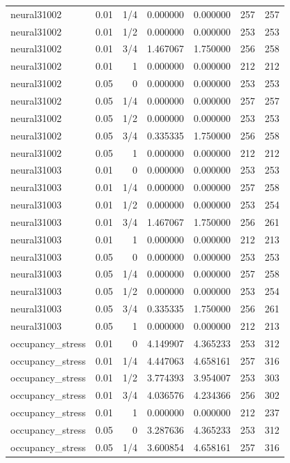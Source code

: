 {\begin{longtable}{lrrrrrr}
neural31002 & 0.01 & 1/4 & 0.000000 & 0.000000 & 257 & 257 \\
neural31002 & 0.01 & 1/2 & 0.000000 & 0.000000 & 253 & 253 \\
neural31002 & 0.01 & 3/4 & 1.467067 & 1.750000 & 256 & 258 \\
neural31002 & 0.01 & 1 & 0.000000 & 0.000000 & 212 & 212 \\
neural31002 & 0.05 & 0 & 0.000000 & 0.000000 & 253 & 253 \\
neural31002 & 0.05 & 1/4 & 0.000000 & 0.000000 & 257 & 257 \\
neural31002 & 0.05 & 1/2 & 0.000000 & 0.000000 & 253 & 253 \\
neural31002 & 0.05 & 3/4 & 0.335335 & 1.750000 & 256 & 258 \\
neural31002 & 0.05 & 1 & 0.000000 & 0.000000 & 212 & 212 \\
neural31003 & 0.01 & 0 & 0.000000 & 0.000000 & 253 & 253 \\
neural31003 & 0.01 & 1/4 & 0.000000 & 0.000000 & 257 & 258 \\
neural31003 & 0.01 & 1/2 & 0.000000 & 0.000000 & 253 & 254 \\
neural31003 & 0.01 & 3/4 & 1.467067 & 1.750000 & 256 & 261 \\
neural31003 & 0.01 & 1 & 0.000000 & 0.000000 & 212 & 213 \\
neural31003 & 0.05 & 0 & 0.000000 & 0.000000 & 253 & 253 \\
neural31003 & 0.05 & 1/4 & 0.000000 & 0.000000 & 257 & 258 \\
neural31003 & 0.05 & 1/2 & 0.000000 & 0.000000 & 253 & 254 \\
neural31003 & 0.05 & 3/4 & 0.335335 & 1.750000 & 256 & 261 \\
neural31003 & 0.05 & 1 & 0.000000 & 0.000000 & 212 & 213 \\
occupancy\_stress & 0.01 & 0 & 4.149907 & 4.365233 & 253 & 312 \\
occupancy\_stress & 0.01 & 1/4 & 4.447063 & 4.658161 & 257 & 316 \\
occupancy\_stress & 0.01 & 1/2 & 3.774393 & 3.954007 & 253 & 303 \\
occupancy\_stress & 0.01 & 3/4 & 4.036576 & 4.234366 & 256 & 302 \\
occupancy\_stress & 0.01 & 1 & 0.000000 & 0.000000 & 212 & 237 \\
occupancy\_stress & 0.05 & 0 & 3.287636 & 4.365233 & 253 & 312 \\
occupancy\_stress & 0.05 & 1/4 & 3.600854 & 4.658161 & 257 & 316 \\

\end{longtable}}
